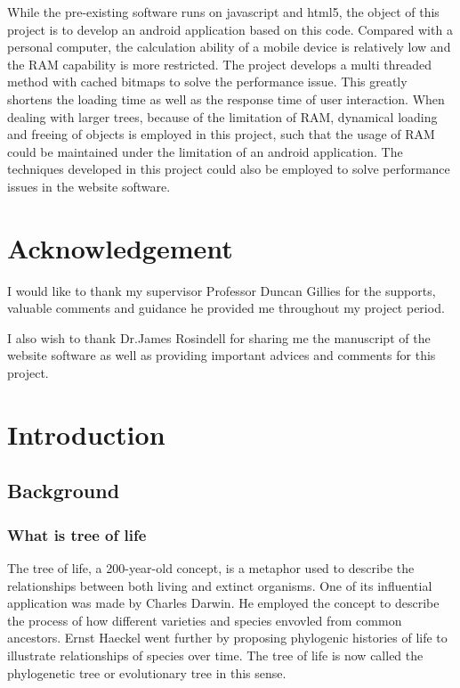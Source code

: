 \documentclass[a4paper,11pt,twoside]{report}
\begin{document}
While the pre-existing software runs on javascript and html5, the object of this project is to develop an android application based on this code. Compared with a personal computer, the calculation ability of a mobile device is relatively low and the RAM capability is more restricted. The project develops a multi threaded method with cached bitmaps to solve the performance issue. This greatly shortens the loading time as well as the response time of user interaction. When dealing with larger trees, because of the limitation of RAM, dynamical loading and freeing of objects is employed in this project, such that the usage of RAM could be maintained under the limitation of an android application. 
The techniques developed in this project could also be employed to solve performance issues in the website software.



\chapter*{Acknowledgement}

I would like to thank my supervisor Professor Duncan Gillies for the supports, valuable comments and guidance he provided me throughout my project period.

I also wish to thank Dr.James Rosindell for sharing me the manuscript of the website software as well as providing important advices and comments for this project.



\tableofcontents
\listoftables
\listoffigures

\chapter{Introduction}

\section{Background}

\subsection{What is tree of life}
The tree of life, a 200-year-old concept,  is a metaphor used to describe the relationships between both living and extinct organisms. One of its influential application was made by Charles Darwin. He employed the concept to describe the process of how different varieties and species envovled  from common ancestors. Ernst Haeckel went further by proposing phylogenic histories of life to illustrate relationships of species over time. The tree of life is now called the phylogenetic tree or evolutionary tree in this sense.\cite{treeOfLifeDefine}\cite{phylogeneticTree}
\end{document}
